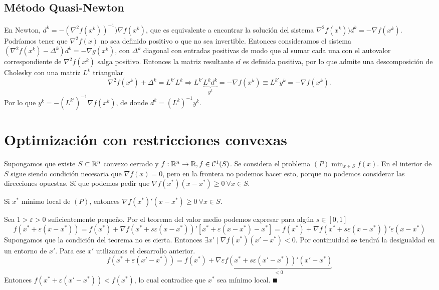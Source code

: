 \documentclass[MIOP.tex]{subfiles}
\begin{document}
\subsection{Método Quasi-Newton}
En Newton, $d^k=-(\nabla^2 f(x^k))^{-1})\nabla f(x^k)$, que es equivalente a encontrar la solución del sistema $\nabla^2 f(x^k))d^k=-\nabla f(x^k)$.  Podríamos tener que $\nabla^2 f(x)$ no sea definido positivo o que no sea invertible. Entonces consideramos el sistema $(\nabla^2 f(x^k)-\Delta^k)d^k=-\nabla g(x^k)$, con $\Delta^k$ diagonal con entradas positivas de modo que al sumar cada una con el autovalor correspondiente de $\nabla^2 f(x^k)$ salga positivo. Entonces la matriz resultante sí es definida positiva, por lo que admite una descomposición de Cholesky con una matriz $L^k$ triangular
$$\nabla^2 f(x^k)+\Delta^k=L^{k'}L^k\Rightarrow L^{k'}\underbrace{L^kd^k}_{y^k}=-\nabla f(x^k)\equiv L^{k'}y^k=-\nabla f(x^k).$$
Por lo que $y^k=-(L^{k'})^{-1}\nabla f(x^k)$, de donde $d^k=(L^k)^{-1}y^k$.
\section{Optimización con restricciones convexas}
Supongamos que existe $S\subset\mathbb{R}^n$ convexo cerrado y $f:\mathbb{R}^n\to\mathbb{R}, f\in\mathcal{C}^1(S)$. Se considera el problema $(P)\min_{x\in S} f(x)$. En el interior de $S$ sigue siendo condición necesaria que $\nabla f(x)=0$, pero en la frontera no podemos hacer esto, porque no podemos considerar las direcciones opuestas. Sí que podemos pedir que $\nabla f(x^*)(x-x^*)\geq 0\ \forall x\in S$. 
\begin{teorema}
Si $x^*$ mínimo local de $(P)$, entonces  $\nabla f(x^*)'(x-x^*)\geq 0\ \forall x\in S$.
\end{teorema}
\begin{dem}
Sea $1>\varepsilon>0$ suficientemente pequeño. Por el teorema del valor medio podemos expresar para algún $s\in[0,1]$
$$f(x^*+\varepsilon(x-x^*))=f(x^*)+\nabla f(x^*+s\varepsilon (x-x^*))'[x^*+\varepsilon(x-x^*)-x^*]=f(x^*)+\nabla f(x^*+s\varepsilon (x-x^*))'\varepsilon(x-x^*)$$
Supongamos que la condición del teorema no es cierta. Entonces $\exists x'\mid \nabla f(x^*)(x'-x^*)<0$. Por continuidad se tendrá la desigualdad en un entorno de $x'$. Para ese $x'$ utilizamos el desarrollo anterior. 
$$f(x^*+\varepsilon(x'-x^*))=f(x^*)+\nabla \varepsilon \underbrace{f(x^*+s\varepsilon (x'-x^*))'(x'-x^*)}_{<0}$$
Entonces $f(x^*+\varepsilon(x'-x^*))< f(x^*)$, lo cual contradice que $x^*$ sea mínimo local. $\QED$
\end{dem}
\end{document}
